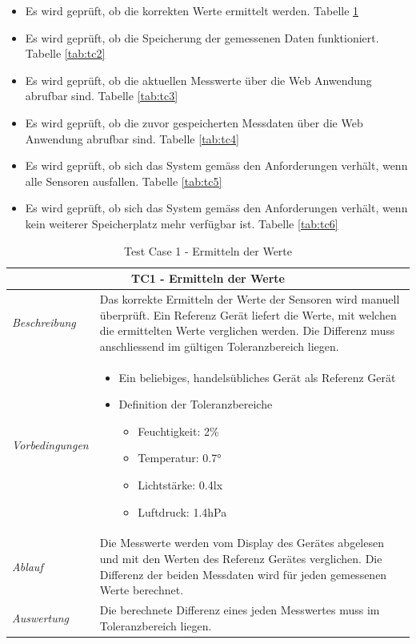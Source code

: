 \documentclass[
    10pt,
    a4paper,
]{scrartcl}
\begin{document}
\begin{itemize}
    \item Es wird geprüft, ob die korrekten Werte ermittelt werden. Tabelle \ref{tab:tc1}
    \item Es wird geprüft, ob die Speicherung der gemessenen Daten funktioniert. Tabelle
        \ref{tab:tc2}
    \item Es wird geprüft, ob die aktuellen Messwerte über die Web Anwendung abrufbar
        sind. Tabelle \ref{tab:tc3}
    \item Es wird geprüft, ob die zuvor gespeicherten Messdaten über die Web Anwendung
        abrufbar sind. Tabelle \ref{tab:tc4}
    \item Es wird geprüft, ob sich das System gemäss den Anforderungen verhält, wenn alle
        Sensoren ausfallen. Tabelle \ref{tab:tc5}
    \item Es wird geprüft, ob sich das System gemäss den Anforderungen verhält, wenn kein
        weiterer Speicherplatz mehr verfügbar ist. Tabelle \ref{tab:tc6}
\end{itemize}

\begin{table}
    \centering
    \begin{tabularx}{\columnwidth}{lX}
        \multicolumn{2}{c}{\textbf{TC1 - Ermitteln der Werte}} \\\toprule
        \textit{Beschreibung} & Das korrekte Ermitteln der Werte der Sensoren wird
            manuell überprüft. Ein Referenz Gerät liefert die Werte, mit welchen die
            ermittelten Werte verglichen werden. Die Differenz muss anschliessend im
            gültigen Toleranzbereich liegen. \\\midrule
        \textit{Vorbedingungen} &
            \begin{itemize}
                \item Ein beliebiges, handelsübliches Gerät als Referenz Gerät
                \item Definition der Toleranzbereiche
                    \begin{itemize}
                        \item Feuchtigkeit: 2\%
                        \item Temperatur: 0.7°
                        \item Lichtstärke: 0.4lx
                        \item Luftdruck: 1.4hPa
                    \end{itemize}
            \end{itemize}
            \\\midrule
        \textit{Ablauf} & Die Messwerte werden vom Display des Gerätes abgelesen und mit
            den Werten des Referenz Gerätes verglichen. Die Differenz der beiden Messdaten
            wird für jeden gemessenen Werte berechnet. \\\midrule
        \textit{Auswertung} & Die berechnete Differenz eines jeden Messwertes muss im
            Toleranzbereich liegen. \\\bottomrule
    \end{tabularx}
    \caption{Test Case 1 - Ermitteln der Werte}
    \label{tab:tc1}
\end{table}
\end{document}
